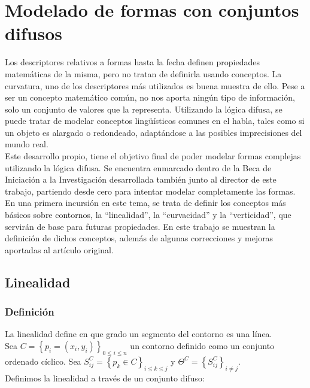 \section{Modelado de formas con conjuntos difusos}

Los descriptores relativos a formas hasta la fecha definen propiedades matemáticas de la misma, pero no tratan de definirla usando conceptos. La curvatura, uno de los descriptores más utilizados es buena muestra de ello. Pese a ser un concepto matemático común, no nos aporta ningún tipo de información, solo un conjunto de valores que la representa. Utilizando la lógica difusa, se puede tratar de modelar conceptos lingüísticos comunes en el habla, tales como si un objeto es alargado o redondeado, adaptándose a las posibles imprecisiones del mundo real.\\

Este desarrollo propio, tiene el objetivo final de poder modelar formas complejas utilizando la lógica difusa. Se encuentra enmarcado dentro de la Beca de Iniciación a la Investigación desarrollada también junto al director de este trabajo, partiendo desde cero para intentar modelar completamente las formas. En una primera incursión en este tema\cite{JChamorro}, se trata de definir los conceptos más básicos sobre contornos, la ``linealidad'', la ``curvacidad'' y la ``verticidad'', que servirán de base para futuras propiedades. En este trabajo se muestran la definición de dichos conceptos, además de algunas correcciones y mejoras aportadas al artículo original.\\

\subsection{Linealidad}

\subsubsection{Definición}
La linealidad define en que grado un segmento del contorno es una línea.\\

Sea $ C = \left\lbrace p_i = \left( x_i,y_i\right) \right\rbrace_{0\leq i\leq n}$ un contorno definido como un conjunto ordenado cíclico. Sea $S^C_{ij} = \left\lbrace p_k \in C \right\rbrace_{i \leq k \leq j}$ y $\Theta^C = \left\lbrace S^C_{ij}\right\rbrace_{i \neq j}$.\\

Definimos la linealidad a través de un conjunto difuso:\\

